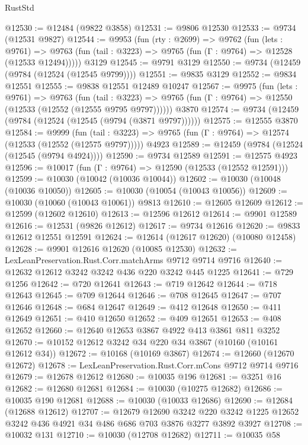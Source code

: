 \begin{lexlean}{RustStd}
\begin{coremodule}
@12530 := @12484 (@9822 @3858)
@12531 := @9806 @12530
@12533 := @9734 (@12531 @9827)
@12544 := @9953
    (fun (rty : @2699) =>
    @9762
      (fun (lets : @9761) =>
      @9763 (fun (tail : @3223) => @9765 (fun (Γ : @9764) => @12528 (@12533 @12494)))))
    @3129
@12545 := @9791 @3129
@12550 := @9734 (@12459 (@9784 (@12524 (@12545 @9799))))
@12551 := @9835 @3129
@12552 := @9834 @12551
@12555 := @9838 @12551 @12489 @10247
@12567 := @9975
    (fun (lets : @9761) =>
    @9763
      (fun (tail : @3223) =>
      @9765 (fun (Γ : @9764) => @12550 (@12533 (@12552 (@12555 @9795 @9797))))))
    @3870
@12574 := @9734 (@12459 (@9784 (@12524 (@12545 (@9794 (@3871 @9797))))))
@12575 := @12555 @3870
@12584 := @9999
    (fun (tail : @3223) => @9765 (fun (Γ : @9764) => @12574 (@12533 (@12552 (@12575 @9797)))))
    @4923
@12589 := @12459 (@9784 (@12524 (@12545 (@9794 @4924))))
@12590 := @9734 @12589
@12591 := @12575 @4923
@12596 := @10017 (fun (Γ : @9764) => @12590 (@12533 (@12552 @12591)))
@12599 := @10030 (@10042 (@10036 @10044))
@12602 := @10030 (@10048 (@10036 @10050))
@12605 := @10030 (@10054 (@10043 @10056))
@12609 := @10030 (@10060 (@10043 @10061)) @9813
@12610 := @12605 @12609
@12612 := @12599 (@12602 @12610)
@12613 := @12596 @12612
@12614 := @9901 @12589
@12616 := @12531 (@9826 @12612)
@12617 := @9734 @12616
@12620 := @9833 @12612 @12551 @12591
@12624 := @12614 (@12617 @12620) (@10080 @12458)
@12628 := @9901 @12616 @12620 (@10085 @12530)
@12632 := LexLeanPreservation.Rust.Corr.matchArms @9712 @9714 @9716
@12640 := @12632 @12612 @3242 @3242 @436 @220 @3242 @445 @1225
@12641 := @729 @1256
@12642 := @720 @12641
@12643 := @719 @12642
@12644 := @718 @12643
@12645 := @709 @12644
@12646 := @708 @12645
@12647 := @707 @12646
@12648 := @684 @12647
@12649 := @412 @12648
@12650 := @411 @12649
@12651 := @410 @12650
@12652 := @409 @12651
@12653 := @408 @12652
@12660 := @12640 @12653 @3867 @4922 @413 @3861 @811 @3252
@12670 := @10152 @12612 @3242 @34 @220 @34 @3867 (@10160 (@10161 @12612 @34))
@12672 := @10168 (@10169 @3867)
@12674 := @12660 (@12670 @12672)
@12678 := LexLeanPreservation.Rust.Corr.mCons @9712 @9714 @9716
@12679 := @12678 @12612
@12680 := @10035 @196
@12681 := @3251 @16
@12682 := @12680 @12681
@12684 := @10030 (@10275 @12682)
@12686 := @10035 @190 @12681
@12688 := @10030 (@10033 @12686)
@12690 := @12684 (@12688 @12612)
@12707 := @12679
    @12690
    @3242
    @220
    @3242
    @1225
    @12652
    @3242
    @436
    @4921
    @34
    @486
    @686
    @703
    @3876
    @3277
    @3892
    @3927
@12708 := @10032 @131
@12710 := @10030 (@12708 @12682)
@12711 := @10035 @58

\end{coremodule}
\end{lexlean}
